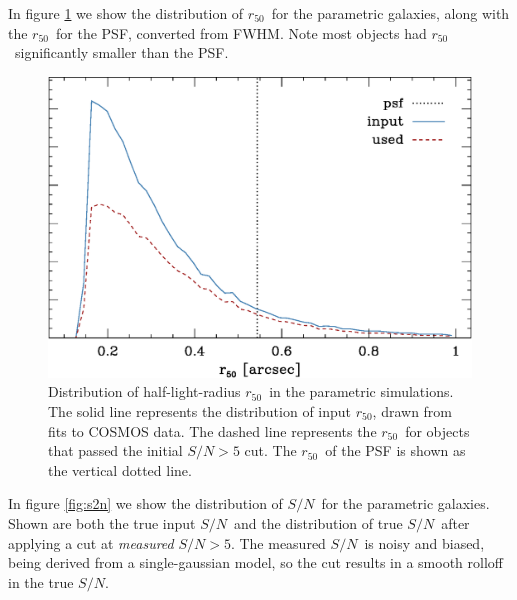 \documentclass[a4paper,fleqn,usenatbib]{mnras}
\newcommand{\snr}{$S/N$}
\newcommand{\hlr}{$r_{50}$}
\begin{document}
In figure \ref{fig:psimhlrcompare} we show the distribution of \hlr\ for the
parametric galaxies, along with the \hlr\ for the PSF,
converted from FWHM.  Note most objects had \hlr\ significantly smaller than
the PSF.

\begin{figure}
    \centering
    \includegraphics[width=\columnwidth]{run-bdj03mcal02-r50.eps}

    \caption{Distribution of half-light-radius \hlr\ in the parametric simulations.
        The solid line represents the distribution of input \hlr, drawn from fits
        to COSMOS data.  The dashed line represents the \hlr\ for objects that passed
		the initial $S/N > 5$ cut.  The \hlr\ of the PSF is shown as the vertical dotted
        line.}

\label{fig:psimhlrcompare}
\end{figure}

In figure \ref{fig:s2n} we show the distribution of \snr\ for the parametric
galaxies.  Shown are both the true input \snr\ and the distribution of true
\snr\ after applying a cut at {\it measured} \snr$ > 5$.  The measured \snr\ is
noisy and biased, being derived from a single-gaussian model, so the cut
results in a smooth rolloff in the true \snr.
\end{document}
